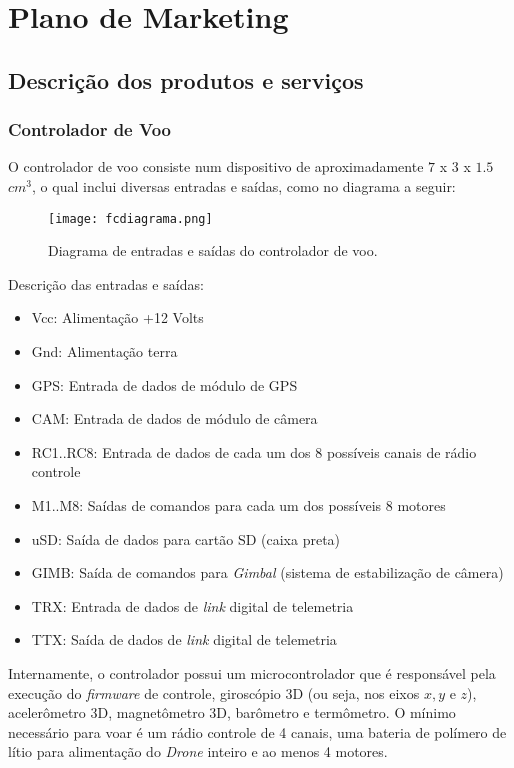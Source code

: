 \section{Plano de Marketing}

\subsection{Descrição dos produtos e serviços}

\subsubsection*{Controlador de Voo}

O controlador de voo consiste num dispositivo de aproximadamente 
$7$ x $3$ x $1.5$ $cm^3$, o qual inclui diversas entradas e saídas, 
como no diagrama a seguir:

\begin{figure}[H]
\centering
\texttt{[image: fcdiagrama.png]}
\caption{Diagrama de entradas e saídas do controlador de voo.}
\label{fig:fcdiagrama}
\end{figure}

Descrição das entradas e saídas:
\begin{itemize}
	\item Vcc: Alimentação +12 Volts
	\item Gnd: Alimentação terra
	\item GPS: Entrada de dados de módulo de GPS
	\item CAM: Entrada de dados de módulo de câmera
	\item RC1..RC8: Entrada de dados de cada um dos 8 possíveis 
	canais de rádio controle
	\item M1..M8: Saídas de comandos para cada um dos possíveis 8 motores
	\item uSD: Saída de dados para cartão SD (caixa preta)
	\item GIMB: Saída de comandos para \emph{Gimbal} (sistema de estabilização de câmera)
	\item TRX: Entrada de dados de \emph{link} digital de telemetria
	\item TTX: Saída de dados de \emph{link} digital de telemetria
\end{itemize}

Internamente, o controlador possui um microcontrolador que é 
responsável pela execução do \emph{firmware} de controle, giroscópio 
3D (ou seja, nos eixos $x, y$ e $z$), acelerômetro 3D, magnetômetro 
3D, barômetro e termômetro. O mínimo necessário para voar é um rádio
controle de 4 canais, uma bateria de polímero de lítio para 
alimentação do \emph{Drone} inteiro e ao menos 4 motores.

